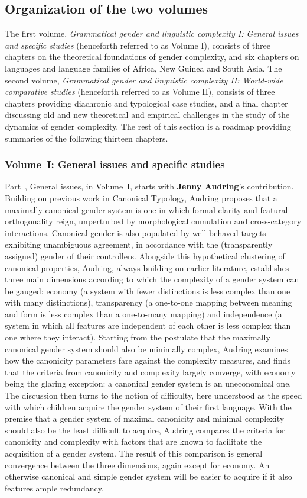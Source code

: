 \documentclass[output=collectionpaper]{langsci/langscibook}
\begin{document}
\subsection*{Organization of the two volumes}
The first volume, \textit{Grammatical gender and linguistic complexity I: General issues and specific studies} (henceforth referred to as Volume I), consists of three chapters on the theoretical foundations of gender complexity, and six chapters on languages and language families of Africa, New Guinea and South Asia. The second volume, \textit{Grammatical gender and linguistic complexity II: World-wide comparative studies} (henceforth referred to as Volume II), consists of three chapters providing diachronic and typological case studies, and a final chapter discussing old and new theoretical and empirical challenges in the study of the dynamics of gender complexity. The rest of this section is a roadmap providing summaries of the following thirteen chapters.

\subsubsection*{Volume~I: General issues and specific studies}
Part~\ptgeneral{}, General issues, in Volume~I, starts with \textbf{Jenny Audring}'s contribution. Building on previous work in Canonical Typology, Audring proposes that a maximally canonical gender system is one in which formal clarity and featural orthogonality reign, unperturbed by morphological cumulation and cross-category interactions. Canonical gender is also populated by well-behaved targets exhibiting unambiguous agreement, in accordance with the (transparently assigned) gender of their controllers. Alongside this hypothetical clustering of canonical properties, Audring, always building on earlier literature, establishes three main dimensions according to which the complexity of a gender system can be gauged: economy (a system with fewer distinctions is less complex than one with many distinctions), transparency (a one-to-one mapping between meaning and form is less complex than a one-to-many mapping) and independence (a system in which all features are independent of each other is less complex than one where they interact). Starting from the postulate that the maximally canonical gender system should also be minimally complex, Audring examines how the canonicity parameters fare against the complexity measures, and finds that the criteria from canonicity and complexity largely converge, with economy being the glaring exception: a canonical gender system is an uneconomical one. The discussion then turns to the notion of difficulty, here understood as the speed with which children acquire the gender system of their first language. With the premise that a gender system of maximal canonicity and minimal complexity should also be the least difficult to acquire, Audring compares the criteria for canonicity and complexity with factors that are known to facilitate the acquisition of a gender system. The result of this comparison is general convergence between the three dimensions, again except for economy. An otherwise canonical and simple gender system will be easier to acquire if it also features ample redundancy.
\end{document}
